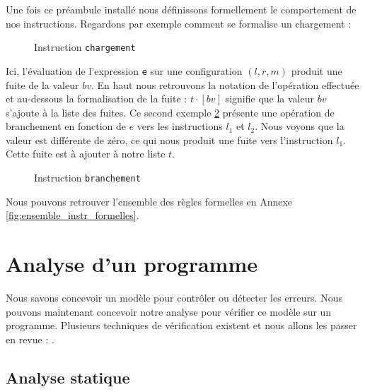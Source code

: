 Une fois ce préambule installé nous définissons formellement le comportement de nos instructions. Regardons par exemple comment se formalise un chargement :

\begin{figure}[!ht]
  \caption{Instruction \texttt{chargement}}
  \label{fig:instr_load}
  \centering
  
\end{figure}

Ici, l'évaluation de l'expression \texttt{e} sur une configuration $(l,r,m)$ produit une fuite de la valeur $bv$. En haut nous retrouvons la notation de l'opération effectuée et au-dessous la formalisation de la fuite : $t \cdot [bv]$ signifie que la valeur $bv$ s'ajoute à la liste des fuites. Ce second exemple \ref{fig:instr_branchement} présente une opération de branchement en fonction de $e$ vers les instructions $l_1$ et $l_2$. Nous voyons que la valeur est différente de zéro, ce qui nous produit une fuite vers l'instruction $l_1$. Cette fuite est à ajouter à notre liste $t$.

\begin{figure}[!ht]
  \caption{Instruction \texttt{branchement}}
  \label{fig:instr_branchement}
  \centering
\end{figure}

Nous pouvons retrouver l'ensemble des règles formelles en Annexe \ref{fig:ensemble_instr_formelles}.

\section{Analyse d'un programme}

Nous savons concevoir un modèle pour contrôler ou détecter les erreurs. Nous pouvons maintenant concevoir notre analyse pour vérifier ce modèle sur un programme. Plusieurs techniques de vérification existent et nous allons les passer en revue : \cite{GeimerEvaluationsSideChannel}.\medbreak


\subsection*{Analyse statique}

